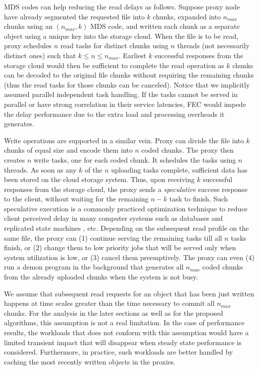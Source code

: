 \documentclass[journal]{IEEEtran}
\begin{document}
MDS codes can help reducing the read delays as follows. Suppose proxy node have already segmented the requested file into $k$ chunks, expanded into $n_{max}$ chunks using an $(n_{max},k)$ MDS code, and written each chunk as a separate object using a unique key into the storage cloud.
When the file is to be read, proxy schedules  $n$ read tasks for distinct chunks using $n$ threads (not necessarily distinct ones) such that $k \le n \le n_{max}$.  Earliest $k$ successful responses from the storage cloud would then be sufficient to complete the read operation as $k$ chunks can be decoded to the original file chunks without requiring the remaining chunks (thus the read tasks for those chunks can be canceled). Notice that we implicitly assumed parallel independent task handling. If the tasks cannot be served in parallel or have strong correlation in their service latencies, FEC would impede the delay performance due to the extra load and processing overheads it generates.


Write operations are supported in a similar vein. Proxy can divide the file into $k$ chunks of equal size and encode them into $n$ coded chunks. The proxy then creates $n$ write tasks, one for each coded chunk. It schedules the tasks using $n$ threads. As soon as any $k$ of the $n$ uploading tasks complete, sufficient data has been stored on the cloud storage system.  
Thus, upon receiving $k$ successful responses from the storage cloud, the proxy sends a {\em speculative} success response to the client, without waiting for the remaining $n-k$ task to finish.
Such speculative execution is a commonly practiced optimization technique to reduce client perceived delay in many computer systems such as databases and replicated state machines \cite{zyzzyva}, etc.
Depending on the subsequent read profile on the same file, the proxy can (1) continue serving the remaining tasks till all $n$ tasks finish, or (2) change them to low priority jobs that will be served only when system utilization is low, or (3) cancel them preemptively. The proxy can even (4) run a demon program in the background that generates all $n_{max}$ coded chunks from the already uploaded chunks when the system is not busy.

We assume that subsequent read requests for an object that has been just written happens at time scales greater than the time necessary to commit all $n_{max}$ chunks. For the analysis in the later sections as well as for the proposed algorithms, this assumption is not a real limitation. In the case of performance results, the workloads that does not conform with this assumption would have a limited transient impact that will disappear when steady state performance is considered. Furthermore, in practice, such workloads are better handled by caching the most recently written objects in the proxies.
\end{document}

